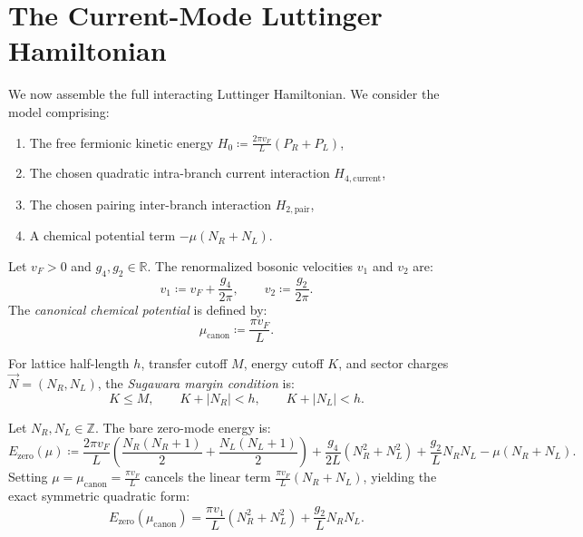 \section{The Current-Mode Luttinger Hamiltonian}

We now assemble the full interacting Luttinger Hamiltonian. We consider the model comprising:
\begin{enumerate}
    \item The free fermionic kinetic energy $H_0 \coloneqq \frac{2\pi v_F}{L} (P_R + P_L)$,
    \item The chosen quadratic intra-branch current interaction $H_{4, \mathrm{current}}$,
    \item The chosen pairing inter-branch interaction $H_{2, \mathrm{pair}}$,
    \item A chemical potential term $-\mu(N_R + N_L)$.
\end{enumerate}

\begin{definition}
Let $v_F > 0$ and $g_4, g_2 \in \mathbb{R}$.
The renormalized bosonic velocities $v_1$ and $v_2$ are:
\begin{equation}
v_1 \coloneqq v_F + \frac{g_4}{2\pi}, \qquad v_2 \coloneqq \frac{g_2}{2\pi}.
\end{equation}
The \emph{canonical chemical potential} is defined by:
\begin{equation}
\mu_{\mathrm{canon}} \coloneqq \frac{\pi v_F}{L}.
\end{equation}
\end{definition}

\begin{definition}
For lattice half-length $h$, transfer cutoff $M$, energy cutoff $K$, and sector charges $\vec{N} = (N_R, N_L)$, the \emph{Sugawara margin condition} is:
\begin{equation}
K \le M, \qquad K + |N_R| < h, \qquad K + |N_L| < h.
\end{equation}
\end{definition}

\begin{lemma}
\label{lem:zero_mode_canonical}
Let $N_R, N_L \in \mathbb{Z}$. The bare zero-mode energy is:
\begin{equation}
E_{\mathrm{zero}}(\mu) \coloneqq \frac{2\pi v_F}{L} \left( \frac{N_R(N_R+1)}{2} + \frac{N_L(N_L+1)}{2} \right) + \frac{g_4}{2L}(N_R^2 + N_L^2) + \frac{g_2}{L} N_R N_L - \mu(N_R + N_L).
\end{equation}
Setting $\mu = \mu_{\mathrm{canon}} = \frac{\pi v_F}{L}$ cancels the linear term $\frac{\pi v_F}{L}(N_R + N_L)$, yielding the exact symmetric quadratic form:
\begin{equation}
E_{\mathrm{zero}}(\mu_{\mathrm{canon}}) = \frac{\pi v_1}{L} \left( N_R^2 + N_L^2 \right) + \frac{g_2}{L} N_R N_L.
\end{equation}
\end{lemma}

